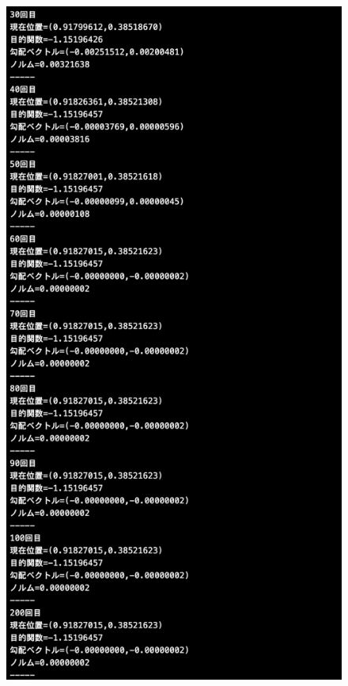 \documentclass[12pt]{jarticle}
\begin{document}
\begin{figure}[h]
\begin{minipage}{0.5\hsize}
\begin{center}
            \includegraphics[scale=0.2]{kadai1_1s_out1_3_2.png}
        \end{center}
    \end{minipage}
    \begin{minipage}{0.5\hsize}

\end{minipage}
\end{figure}
\end{document}
